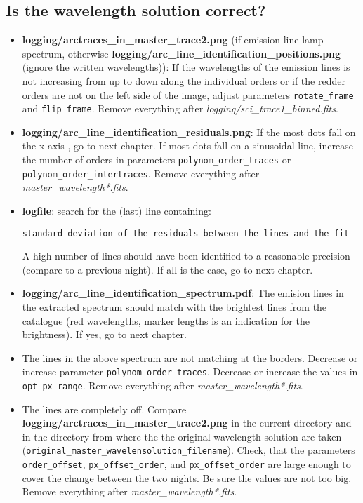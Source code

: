 \documentclass[10pt,a4paper]{article}
\begin{document}
\subsection{Is the wavelength solution correct?}
\label{Section:FAQ_wavelength_solution}
\begin{itemize}
  \item \textbf{logging/arctraces\_in\_master\_trace2.png} (if emission line lamp spectrum, otherwise \textbf{logging/arc\_line\_identification\_positions.png} (ignore the written wavelengths)): If the wavelengths of the emission lines is not increasing from up to down along the individual orders or if the redder orders are not on the left side of the image, adjust parameters \verb|rotate_frame| and \verb|flip_frame|. Remove everything after \textit{logging/sci\_trace1\_binned.fits}.
  \item \textbf{logging/arc\_line\_identification\_residuals.png}: If the most dots fall on the x-axis , go to next chapter. If most dots fall on a sinusoidal line, increase the number of orders in parameters \verb|polynom_order_traces| or \verb|polynom_order_intertraces|. Remove everything after \textit{ master\_wavelength*.fits}.
  \item \textbf{logfile}: search for the (last) line containing:
  \begin{lstlisting}[style=base]
 standard deviation of the residuals between the lines and the fit
  \end{lstlisting}
  A high number of lines should have been identified to a reasonable precision (compare to a previous night). If all is the case, go to next chapter.
  \item \textbf{logging/arc\_line\_identification\_spectrum.pdf}: The emision lines in the extracted spectrum should match with the brightest lines from the catalogue (red wavelengths, marker lengths is an indication for the brightness). If yes, go to next chapter.
  \item The lines in the above spectrum are not matching at the borders. Decrease or increase parameter \verb|polynom_order_traces|. Decrease or increase the values in \verb|opt_px_range|. Remove everything after \textit{ master\_wavelength*.fits}.
  \item The lines are completely off. Compare \textbf{logging/arctraces\_in\_master\_trace2.png} in the current directory and in the directory from where the the original wavelength solution are taken (\verb|original_master_wavelensolution_filename|). Check, that the parameters \verb|order_offset|, \verb|px_offset_order|, and \verb|px_offset_order| are large enough to cover the change between the two nights. Be sure the values are not too big. Remove everything after \textit{master\_wavelength*.fits}.
\end{itemize}
\end{document}
